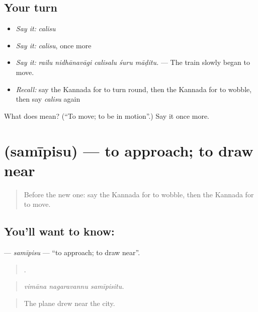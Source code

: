 \subsection*{Your turn}
\begin{itemize}
\raggedright
  \item \emph{Say it:} \emph{calisu}
  \item \emph{Say it:} \emph{calisu}, once more
  \item \emph{Say it:} \emph{railu nidhānavāgi calisalu śuru māḍitu.} — The train slowly began to move.
  \item \emph{Recall:} say the Kannada for to turn round, then the Kannada for to wobble, then say \emph{calisu} again
\end{itemize}

\begin{tcolorbox}[breakable,colback=teal!4,colframe=teal!35!black,title={Before you move on}]
What does  mean? (\textquotedblleft{}To move; to be in motion\textquotedblright{}.) Say it once more.
\end{tcolorbox}
\section[\texorpdfstring{\kn{ಸಮೀಪಿಸು} (samīpisu)}{ಸಮೀಪಿಸು (samīpisu)}]{ (samīpisu) — to approach; to draw near}

\label{lesson:KA-C445-samipisu}



\begin{quote}
Before the new one: say the Kannada for to wobble, then the Kannada for to move.
\end{quote}

\subsection*{You'll want to know: }
\textbf{} — \emph{samīpisu} — \textquotedblleft{}to approach; to draw near\textquotedblright{}.

\begin{quote}
  .
\end{quote}

\begin{quote}
\emph{vimāna nagaravannu samīpisitu.}
\end{quote}

\begin{quote}
The plane drew near the city.
\end{quote}

